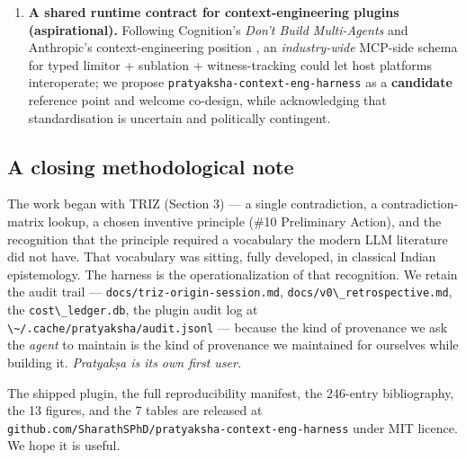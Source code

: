 \begin{enumerate}
\item
  \textbf{A shared runtime contract for context-engineering plugins (aspirational).} Following Cognition's \emph{Don't Build Multi-Agents} \citep{yan2025dontbuild} and Anthropic's context-engineering position \citep{anthropic2025contexteng}, an \emph{industry-wide} MCP-side schema for typed limitor + sublation + witness-tracking could let host platforms interoperate; we propose \passthrough{\lstinline!pratyaksha-context-eng-harness!} as a \textbf{candidate} reference point and welcome co-design, while acknowledging that standardisation is uncertain and politically contingent.
\end{enumerate}

\subsection{A closing methodological note}\label{a-closing-methodological-note}

The work began with TRIZ (Section 3) --- a single contradiction, a contradiction-matrix lookup, a chosen inventive principle (\#10 Preliminary Action), and the recognition that the principle required a vocabulary the modern LLM literature did not have. That vocabulary was sitting, fully developed, in classical Indian epistemology. The harness is the operationalization of that recognition. We retain the audit trail --- \passthrough{\lstinline!docs/triz-origin-session.md!}, \passthrough{\lstinline!docs/v0\_retrospective.md!}, the \passthrough{\lstinline!cost\_ledger.db!}, the plugin audit log at \passthrough{\lstinline!\~/.cache/pratyaksha/audit.jsonl!} --- because the kind of provenance we ask the \emph{agent} to maintain is the kind of provenance we maintained for ourselves while building it. \emph{Pratyakṣa is its own first user.}

The shipped plugin, the full reproducibility manifest, the 246-entry bibliography, the 13 figures, and the 7 tables are released at \passthrough{\lstinline!github.com/SharathSPhD/pratyaksha-context-eng-harness!} under MIT licence. We hope it is useful.
